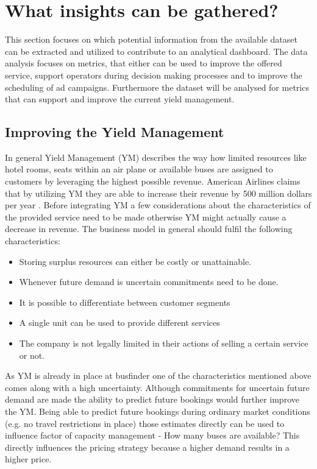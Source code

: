 %
%
% 
% 
% 


\chapter{What insights can be gathered?}
This section focuses on which potential information from the available dataset can be extracted and utilized to contribute to an analytical dashboard. The data analysis focuses on metrics, that either can be used to improve the offered service, support operators during decision making processes and to improve the scheduling of ad campaigns. Furthermore the dataset will be analysed for metrics that can support and improve the current yield management. 


\section{Improving the Yield Management}
In general Yield Management (YM) describes the way how limited resources like hotel rooms, seats within an air plane or available buses are assigned to customers by leveraging the highest possible revenue. American Airlines claims that by utilizing YM they are able to increase their revenue by 500 million dollars per year \cite{ym_practice}. Before integrating YM a few considerations about the characteristics of the provided service need to be made otherwise YM might actually cause a decrease in revenue. The business model in general should fulfil the following characteristics:\cite{ym_practice}
\begin{itemize}
  \item Storing surplus resources can either be costly or unattainable. 
  \item Whenever future demand is uncertain commitments need to be done.
  \item It is possible to differentiate between customer segments
  \item A single unit can be used to provide different services 
  \item The company is not legally limited in their actions of selling a certain service or not.
\end{itemize}
As YM is already in place at busfinder one of the characteristics mentioned above comes along with a high uncertainty. Although commitments for uncertain future demand are made the ability to predict future bookings would further improve the YM. Being able to predict future bookings during ordinary market conditions (e.g. no travel restrictions in place) those estimates directly can be used to influence factor of capacity management - How many buses are available? This directly influences the pricing strategy because a higher demand results in a higher price.

